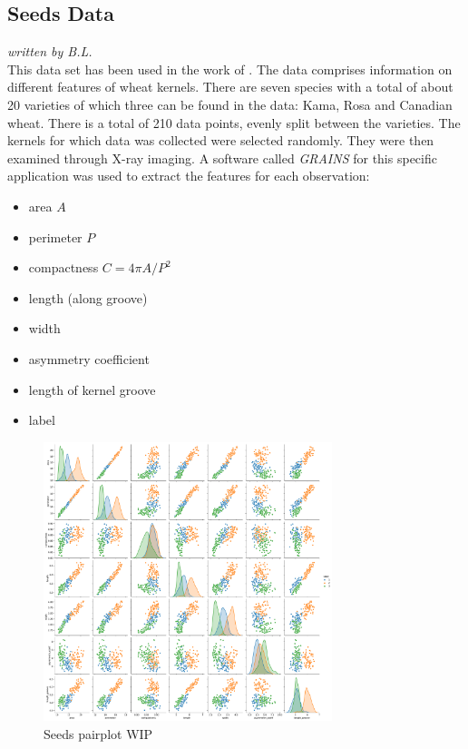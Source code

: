 \subsection{Seeds Data}
\textit{written by B.L.}\\

This data set has been used in the work of \cite{charytanowicz2010complete}. The data comprises information on different features of wheat kernels. There are seven species with a total of about 20 varieties of which three can be found in the data: Kama, Rosa and Canadian wheat. There is a total of 210 data points, evenly split between the varieties. The kernels for which data was collected were selected randomly. They were then examined through X-ray imaging. A software called \textit{GRAINS} for this specific application \cite{strumillo1999computer} was used to extract the features for each observation:
\begin{multicols}{2}
\begin{itemize}
\item area $A$
\item perimeter $P$
\item compactness $C = 4 \pi A/P^{2}$
\item length (along groove)
\item width
\item asymmetry coefficient
\item length of kernel groove
\item label
\end{itemize}
\end{multicols}

\begin{figure}[H]
\caption{Seeds pairplot WIP}
%
\begin{center}
\includegraphics[width=0.75\textwidth]{images/seeds_pairplot.pdf}
\end{center}
\label{img:seeds_pairplot}
\end{figure}

